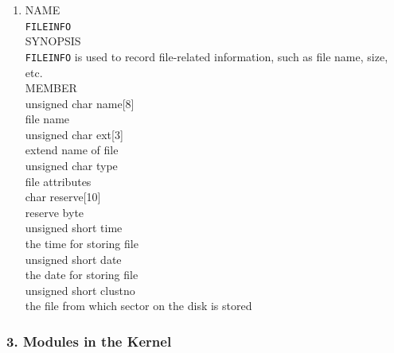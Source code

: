 \documentclass{swfcthesis}
\begin{document}
\begin{enumerate}
\item
  NAME \\
  \hspace*{1cm}\texttt{FILEINFO} \\
  SYNOPSIS \\
  \hspace*{1cm} \texttt{FILEINFO} is used to record file-related information, such as file name, size, etc.\\
  MEMBER \\
  \hspace*{1cm} unsigned char name[8]\\
  \hspace*{1.5cm}  file name\\
  \hspace*{1cm} unsigned char ext[3]\\
  \hspace*{1.5cm} extend name of file\\
  \hspace*{1cm} unsigned char type\\
  \hspace*{1.5cm}  file attributes\\
  \hspace*{1cm} char reserve[10]\\
  \hspace*{1.5cm} reserve byte\\
  \hspace*{1cm}  unsigned short time\\
  \hspace*{1.5cm} the time for storing file\\
  \hspace*{1cm} unsigned short date\\
  \hspace*{1.5cm}  the date for storing file\\
  \hspace*{1cm} unsigned short  clustno\\
  \hspace*{1.5cm}the file from which sector on the disk is stored \\
  
\end{enumerate}
    
\subsubsection{3. Modules in the Kernel}
\label{sec:3.-modules-kernel}
\end{document}
